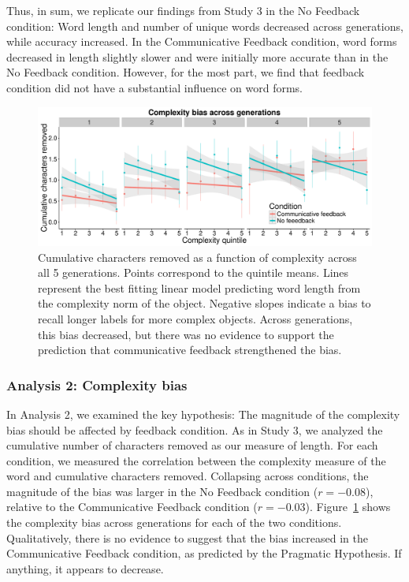 Thus, in sum, we replicate our findings from Study 3 in the No Feedback condition: Word length and number of unique words decreased across generations, while accuracy increased. In the Communicative Feedback condition, word forms decreased in length slightly slower and were initially more accurate than in the No Feedback condition. However, for the most part, we find that feedback condition did not have a substantial influence on word forms.

\begin{figure}[t!]
\begin{center}
\includegraphics[scale = .5]{figs/chap4_4bias.pdf}
\end{center}
\caption{Cumulative characters removed as a function of complexity across all 5 generations. Points correspond to the quintile means. Lines represent the best fitting linear model predicting word length from the complexity norm of the object. Negative slopes indicate a bias to recall longer labels for  more complex objects. Across generations, this bias decreased, but there was no evidence to support the prediction that communicative feedback strengthened the bias.}
\label{fig:cbias4}
\end{figure}


\subsubsection{Analysis 2: Complexity bias}
In Analysis 2, we examined the key hypothesis: The magnitude of the complexity bias should be affected by feedback condition. As in Study 3, we analyzed the cumulative number of characters removed as our measure of length. For each condition, we measured the correlation between the complexity measure of the word and cumulative characters removed. Collapsing across conditions, the magnitude of the bias was larger in the No Feedback condition ($r = -0.08$), relative to the Communicative Feedback condition  ($r = -0.03$).  Figure\ \ref{fig:cbias4} shows the complexity bias across generations for each of the two conditions. Qualitatively, there is no evidence to suggest that the bias increased in the Communicative Feedback condition, as predicted by the Pragmatic Hypothesis. If anything, it appears to decrease. 


